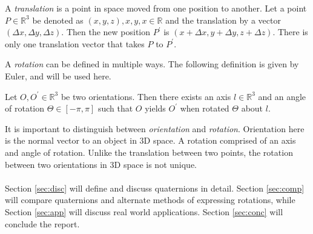 \begin{defn}[Translation]
A \textit{translation} is a point in space moved from one position to another.
Let a point $P \in \mathbb{R}^3$ be denoted as $(x,y,z), x,y,x \in \mathbb{R}$ and the translation by a vector $(\Delta x, \Delta y, \Delta z)$.
Then the new position $P^\prime$ is $(x + \Delta x, y + \Delta y, z + \Delta z)$.
There is only one translation vector that takes $P$ to $P^\prime$.
\end{defn}

\noindent A \textit{rotation} can be defined in multiple ways.
The following definition is given by Euler, and will be used here.

\begin{defn}
Let $O, O^\prime \in \mathbb{R}^3$ be two orientations.
Then there exists an axis $l \in \mathbb{R}^3$ and an angle of rotation $\Theta \in [-\pi, \pi]$ such that $O$ yields $O^\prime$ when rotated $\Theta$ about $l$.
\end{defn}

\noindent It is important to distinguish between \textit{orientation} and \textit{rotation}.
Orientation here is the normal vector to an object in 3D space.
A rotation comprised of an axis and angle of rotation.
Unlike the translation between two points, the rotation between two orientations in 3D space is not unique.
\\ \\
\noindent Section \ref{sec:disc} will define and discuss quaternions in detail.
Section \ref{sec:comp} will compare quaternions and alternate methods of expressing rotations, while Section \ref{sec:app} will discuss real world applications.
Section \ref{sec:conc} will conclude the report. 
